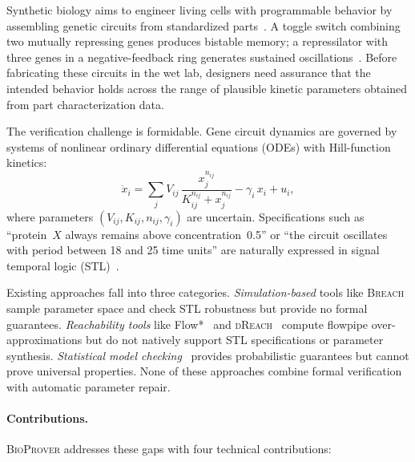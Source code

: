 \documentclass[11pt]{article}
\newcommand{\bioprover}{\textsc{BioProver}}
\newcommand{\dreach}{\textsc{dReach}}
\newcommand{\breach}{\textsc{Breach}}
\newcommand{\stl}{\textsc{STL}}
\begin{document}
Synthetic biology aims to engineer living cells with programmable
behavior by assembling genetic circuits from standardized
parts~\cite{endy2005foundations}. A toggle switch combining two
mutually repressing genes produces bistable memory; a repressilator
with three genes in a negative-feedback ring generates sustained
oscillations~\cite{elowitz2000synthetic}. Before fabricating these
circuits in the wet lab, designers need assurance that the intended
behavior holds across the range of plausible kinetic parameters
obtained from part characterization data.

The verification challenge is formidable. Gene circuit dynamics are
governed by systems of nonlinear ordinary differential equations
(ODEs) with Hill-function kinetics:
\begin{equation}
\label{eq:hill}
  \dot{x}_i = \sum_j V_{ij}\,\frac{x_j^{n_{ij}}}{K_{ij}^{n_{ij}} + x_j^{n_{ij}}}
  - \gamma_i\,x_i + u_i,
\end{equation}
where parameters $(V_{ij}, K_{ij}, n_{ij}, \gamma_i)$ are uncertain.
Specifications such as ``protein~$X$ always remains above
concentration~0.5'' or ``the circuit oscillates with period between
18 and 25 time units'' are naturally expressed in signal temporal
logic (\stl{})~\cite{maler2004monitoring}.

Existing approaches fall into three categories.
\emph{Simulation-based} tools like \breach{}~\cite{donze2010breach}
sample parameter space and check \stl{} robustness but provide no
formal guarantees.
\emph{Reachability tools} like Flow*~\cite{chen2013flow} and
\dreach{}~\cite{kong2015dreach} compute flowpipe
over-approximations but do not natively support \stl{} specifications
or parameter synthesis.
\emph{Statistical model checking}~\cite{younes2006statistical}
provides probabilistic guarantees but cannot prove universal
properties. None of these approaches combine formal verification with
automatic parameter repair.

\paragraph{Contributions.}
\bioprover{} addresses these gaps with four technical contributions:
\end{document}
